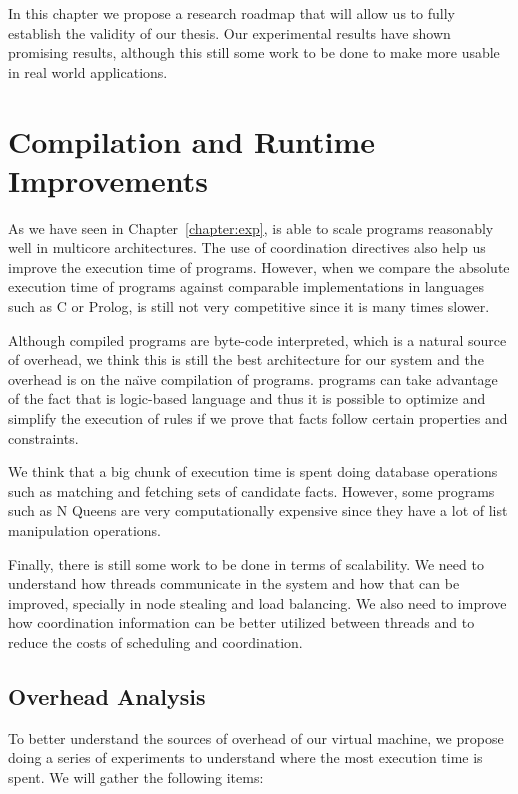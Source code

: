 
In this chapter we propose a research roadmap that will allow us to fully establish the validity of our thesis.
Our experimental results have shown promising results, although this still some work to be done to make
\lang more usable in real world applications.

\section{Compilation and Runtime Improvements}

As we have seen in Chapter~\ref{chapter:exp}, \lang is able to scale programs reasonably well
in multicore architectures.
The use of coordination directives also help us improve the execution time of programs. However,
when we compare the absolute execution time of programs against comparable implementations in
languages such as C or Prolog, \lang is still not very competitive since it is many times slower.

Although compiled \lang programs are byte-code interpreted, which is a natural
source of overhead, we think this is still the best architecture for our system and the overhead
is on the na\"{\i}ve compilation of programs. \lang programs can take advantage of the fact that
\lang is logic-based language and thus it is possible to optimize and simplify the execution of rules
if we prove that facts follow certain properties and constraints.

We think that a big chunk of execution time is spent doing
database operations such as matching and fetching sets of candidate facts.
However, some programs such as N Queens are very computationally expensive since they have
a lot of list manipulation operations.

Finally, there is still some work to be done in terms of scalability. We need to understand how
threads communicate in the system and how that can be improved, specially in node stealing and load balancing.
We also need to improve how coordination information can be better utilized between threads and to reduce the costs
of scheduling and coordination.

\subsection{Overhead Analysis}

To better understand the sources of overhead of our virtual machine, we propose doing a series
of experiments to understand where the most execution time is spent. We will gather the following
items:


